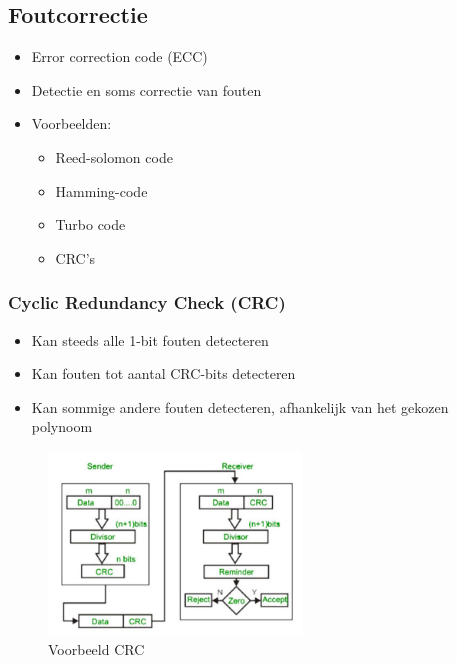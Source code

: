 \documentclass{article}
\begin{document}
\subsection{Foutcorrectie}
\begin{itemize}
    \item Error correction code (ECC)
    \item Detectie en soms correctie van fouten
    \item Voorbeelden:
    \begin{itemize}
        \item Reed-solomon code
        \item Hamming-code 
        \item Turbo code
        \item CRC's
    \end{itemize}
\end{itemize}

\subsubsection{Cyclic Redundancy Check (CRC)}
\begin{itemize}
    \item Kan steeds alle 1-bit fouten detecteren
    \item Kan fouten tot aantal CRC-bits detecteren
    \item Kan sommige andere fouten detecteren, afhankelijk van het gekozen polynoom
\end{itemize}

\begin{figure}[H]
    \centering
    \includegraphics[width=0.6\textwidth]{Screenshot_20200420_121925.png}
    \caption{Voorbeeld CRC}
\end{figure}
\end{document}
